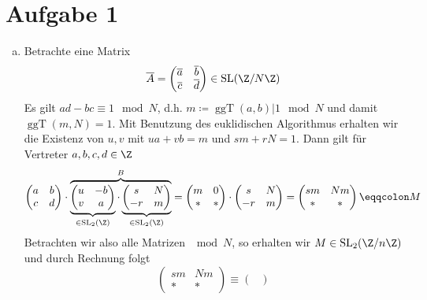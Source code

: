 \documentclass{article}
\newcommand{\ggT}{\operatorname{ggT}}
\begin{document}
\section*{Aufgabe 1}
\begin{enumerate}[(a)]
    \item Betrachte eine Matrix
    \[
        \overline{A} =  \begin{pmatrix}
            \overline{a} & \overline{b}\\
            \overline{c} & \overline{d}
        \end{pmatrix} \in \operatorname{SL}(\Z/N\Z)
    \]
    Es gilt $ad - bc \equiv 1 \mod N$, d.h. $m \coloneqq \ggT(a,b) | 1 \mod N$ und damit $\ggT(m, N) = 1$.
    Mit Benutzung des euklidischen Algorithmus erhalten wir die Existenz von $u, v$ mit $ua + vb = m$ und $sm + rN = 1$.
    Dann gilt für Vertreter $a,b,c,d\in \Z$
    \[
        \begin{pmatrix}
            a & b\\
            c & d
        \end{pmatrix} \cdot
        \overbrace{
        \underbrace{\begin{pmatrix}
            u & -b\\
            v & a
        \end{pmatrix}}_{\in \operatorname{SL}_2(\Z)} \cdot
        \underbrace{\begin{pmatrix}
            s & N\\
            -r & m
        \end{pmatrix}}_{\in \operatorname{SL}_2(\Z)}}^{B}
        = \begin{pmatrix}
            m & 0\\
            * & *
        \end{pmatrix} \cdot \begin{pmatrix}
            s & N\\
            -r & m
        \end{pmatrix}
        = \begin{pmatrix}
            sm & Nm\\
            * & *
        \end{pmatrix} \eqqcolon M
    \]
    Betrachten wir also alle Matrizen $\mod N$, so erhalten wir $M \in \operatorname{SL}_2(\Z/n\Z)$ und durch Rechnung folgt
    \[
        \begin{pmatrix}
            sm & Nm\\
            * & *
        \end{pmatrix} \equiv \begin{pmatrix}

\end{pmatrix}\]
\end{enumerate}
\end{document}

